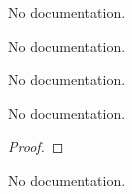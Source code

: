 \begin{definition}\label{FnLb}
        \leanok
                No documentation.
    \end{definition}

\begin{definition}\label{FnHasUb}
        \leanok
                No documentation.
    \end{definition}

\begin{definition}\label{FnHasLb}
        \leanok
                No documentation.
    \end{definition}

\begin{theorem}\label{fnUb_add}
        \leanok
                No documentation.
    \end{theorem}

\begin{proof}
    \leanok
\end{proof}

\begin{definition}\label{ConvergesTo}
        \leanok
                No documentation.
    \end{definition}

